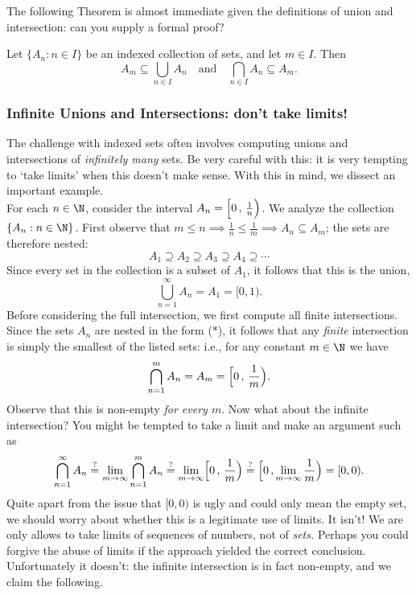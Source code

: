 \noindent The following Theorem is almost immediate given the definitions of union and intersection: can you supply a formal proof?

\begin{thm}
Let $\{A_n:n\in I\}$ be an indexed collection of sets, and let $m\in I$. Then
\[A_m\subseteq\bigcup_{n\in I}A_n\quad\text{and}\quad \bigcap_{n\in I}A_n\subseteq A_m.\]
\end{thm}





\subsubsection*{Infinite Unions and Intersections: don't take limits!}

The challenge with indexed sets often involves computing unions and intersections of \emph{infinitely many} sets. Be very careful with this: it is very tempting to `take limits' when this doesn't make sense. With this in mind, we dissect an important example.\\

\noindent For each $n\in\N$, consider the interval $A_n=\Bigl[0\,,\,\frac 1n\Bigr)$. We analyze the collection $\{A_n:n\in\N\}$. First observe that $m\le n\implies \frac 1n\le \frac 1m\implies A_n\subseteq A_m$; the sets are therefore nested:
\[A_1\supseteq A_2\supseteq A_3\supseteq A_4\supseteq\cdots\tag*{($\ast$)}\]
Since every set in the collection is a subset of $A_1$, it follows that this is the union,
\[\bigcup_{n=1}^\infty A_n=A_1=[0,1).\]
Before considering the full intersection, we first compute all finite intersections. Since the sets $A_n$ are nested in the form ($\ast$), it follows that any \emph{finite} intersection is simply the smallest of the listed sets: i.e., for any constant $m\in\N$ we have
\[\bigcap_{n=1}^mA_n=A_m=\Bigl[0\,,\,\frac 1m\Bigr).\]
Observe that this is non-empty \emph{for every $m$}. Now what about the infinite intersection? You might be tempted to take a limit and make an argument such as
\[\bigcap\limits_{n=1}^\infty A_n\overset{?}{=}\lim_{m\to\infty}\bigcap_{n=1}^mA_n\overset{?}{=}\lim_{m\to\infty}\Bigl[0\,,\,\frac 1m\Bigr)\overset{?}{=}\Bigl[0\,,\lim_{m\to\infty}\frac 1m\Bigr)=[0,0).\]
Quite apart from the issue that $[0,0)$ is ugly and could only mean the empty set, we should worry about whether this is a legitimate use of limits. It isn't! We are only allows to take limits of sequences of numbers, not of \emph{sets.} Perhaps you could forgive the abuse of limits if the approach yielded the correct conclusion. Unfortunately it doesn't: the infinite intersection is in fact non-empty, and we claim the following.

